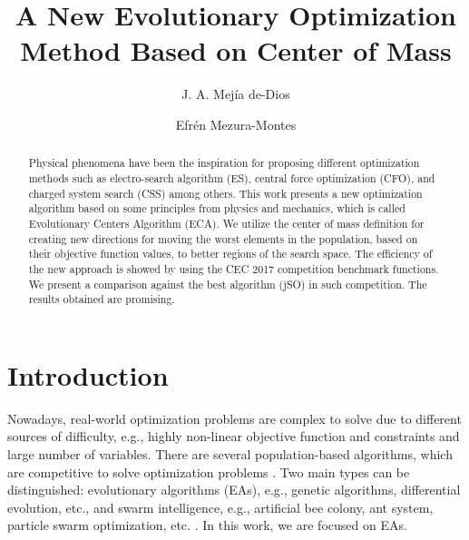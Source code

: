 \documentclass{svproc}
\begin{document}
\mainmatter              %

\title{A New Evolutionary Optimization Method Based on Center of Mass}
%

\author{J. A. Mej\'ia de-Dios \and Efr\'en Mezura-Montes}
%
%

\maketitle

\begin{abstract}
Physical phenomena have been the inspiration for proposing different
optimization methods such as electro-search algorithm (ES), central force 
optimization (CFO), and charged system search (CSS) among others. This work presents a new 
optimization algorithm based on some principles from physics and
mechanics, which is called Evolutionary Centers Algorithm (ECA). We utilize 
the center of mass definition for creating new directions for moving the worst 
elements in the population,  based on their objective function values, %
to better regions of the search space.  The efficiency of the new approach is showed by using the 
CEC 2017 competition benchmark functions. We present a comparison against the best algorithm (jSO) 
in such competition.  The results obtained are promising.
\end{abstract}

\section{Introduction}
Nowadays, real-world optimization problems  are complex to solve due to 
different sources of difficulty, e.g., highly  non-linear objective function 
and constraints and large number of variables. There are several population-based 
algorithms, which are competitive to solve optimization problems \cite{easSurv}.  
Two main  types can be distinguished:  evolutionary algorithms (EAs), e.g., genetic algorithms, 
differential evolution, etc., \cite{jso2017,melanie96,ed1995} and swarm 
intelligence, e.g., artificial bee colony, ant system, particle swarm optimization, etc.
\cite{abc2005,pso1995}. In this work, we are focused on EAs.\\
\end{document}
